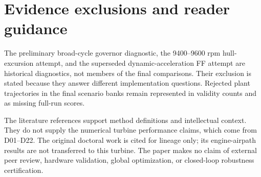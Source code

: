 \documentclass[11pt,a4paper,oneside]{report}
\begin{document}
\section{Evidence exclusions and reader guidance}
The preliminary broad-cycle governor diagnostic, the 9400--9600 rpm hull-excursion attempt, and the superseded dynamic-acceleration FF attempt are historical diagnostics, not members of the final comparisons. Their exclusion is stated because they answer different implementation questions. Rejected plant trajectories in the final scenario banks remain represented in validity counts and as missing full-run scores.

The literature references support method definitions and intellectual context. They do not supply the numerical turbine performance claims, which come from D01--D22. The original doctoral work is cited for lineage only; its engine-airpath results are not transferred to this turbine. The paper makes no claim of external peer review, hardware validation, global optimization, or closed-loop robustness certification.

\clearpage

\end{document}
